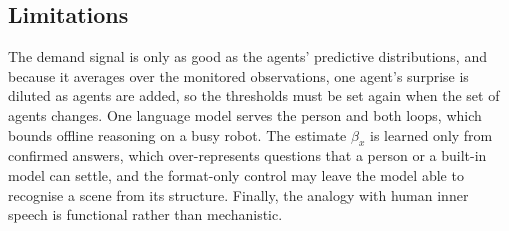 \subsection{Limitations}
\label{sec:inner_speech:limitations}

The demand signal is only as good as the agents' predictive distributions, and because it averages over the
monitored observations, one agent's surprise is diluted as agents are added, so the thresholds must be set again
when the set of agents changes. One language model serves the person and both loops, which bounds offline reasoning on a busy
robot. The estimate $\beta_x$ is learned only from confirmed answers, which over-represents questions that a person or
a built-in model can settle, and the format-only control may leave the model able to recognise a scene from its
structure. Finally, the analogy with human inner speech is functional rather than mechanistic.
